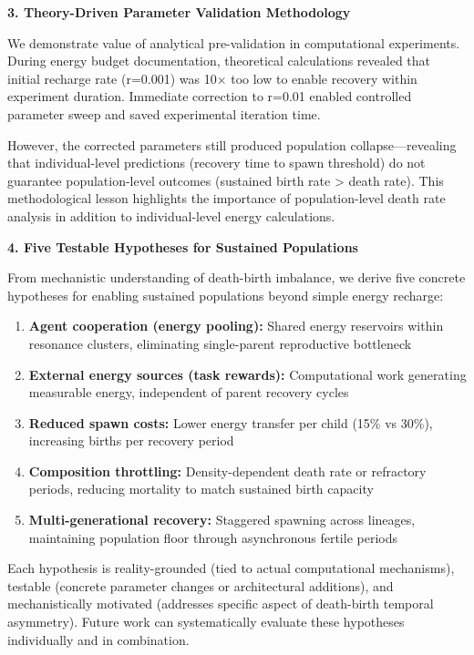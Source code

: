 \documentclass[
]{article}
\providecommand{\tightlist}{%
  \setlength{\itemsep}{0pt}\setlength{\parskip}{0pt}}
\begin{document}
\textbf{3. Theory-Driven Parameter Validation Methodology}

We demonstrate value of analytical pre-validation in computational
experiments. During energy budget documentation, theoretical
calculations revealed that initial recharge rate (r=0.001) was 10× too
low to enable recovery within experiment duration. Immediate correction
to r=0.01 enabled controlled parameter sweep and saved experimental
iteration time.

However, the corrected parameters still produced population
collapse---revealing that individual-level predictions (recovery time to
spawn threshold) do not guarantee population-level outcomes (sustained
birth rate \textgreater{} death rate). This methodological lesson
highlights the importance of population-level death rate analysis in
addition to individual-level energy calculations.

\textbf{4. Five Testable Hypotheses for Sustained Populations}

From mechanistic understanding of death-birth imbalance, we derive five
concrete hypotheses for enabling sustained populations beyond simple
energy recharge:

\begin{enumerate}
\def\labelenumi{\arabic{enumi}.}
\tightlist
\item
  \textbf{Agent cooperation (energy pooling):} Shared energy reservoirs
  within resonance clusters, eliminating single-parent reproductive
  bottleneck
\item
  \textbf{External energy sources (task rewards):} Computational work
  generating measurable energy, independent of parent recovery cycles
\item
  \textbf{Reduced spawn costs:} Lower energy transfer per child (15\% vs
  30\%), increasing births per recovery period
\item
  \textbf{Composition throttling:} Density-dependent death rate or
  refractory periods, reducing mortality to match sustained birth
  capacity
\item
  \textbf{Multi-generational recovery:} Staggered spawning across
  lineages, maintaining population floor through asynchronous fertile
  periods
\end{enumerate}

Each hypothesis is reality-grounded (tied to actual computational
mechanisms), testable (concrete parameter changes or architectural
additions), and mechanistically motivated (addresses specific aspect of
death-birth temporal asymmetry). Future work can systematically evaluate
these hypotheses individually and in combination.
\end{document}
